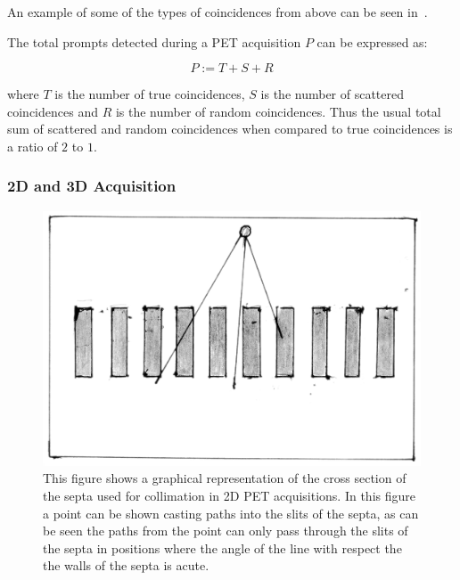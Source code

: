             An example of some of the types of coincidences from above can be seen in~.
            
            The total prompts detected during a \gls{PET} acquisition $P$ can be expressed as:
            
            \begin{equation}
                P := T + S + R
            \end{equation}
            
            \noindent where $T$ is the number of true coincidences, $S$ is the number of scattered coincidences and $R$ is the number of random coincidences. Thus the usual total sum of scattered and random coincidences when compared to true coincidences is a ratio of $2$ to $1$.
            
            \subsubsection{2D and 3D Acquisition} \label{sec:2d_and_3d_acquisition}
                \begin{figure}
                    \centering
                    
                    \includegraphics[width=1.0\linewidth]{figures/background_septa.png}
                    
                    \captionsetup{singlelinecheck=false, justification=raggedright}
                    \caption{This figure shows a graphical representation of the cross section of the septa used for collimation in \gls{2D} \gls{PET} acquisitions. In this figure a point can be shown casting paths into the slits of the septa, as can be seen the paths from the point can only pass through the slits of the septa in positions where the angle of the line with respect the the walls of the septa is acute.} \label{fig:2d_and_3d_acquisition_septa}
                \end{figure}
                
